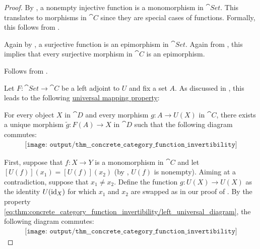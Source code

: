 \begin{proof}
   By , a nonempty injective function is a monomorphism in \( \cat{Set} \). This translates to morphisms in \( \cat{C} \) since they are special cases of functions. Formally, this follows from .

   Again by , a surjective function is an epimorphism in \( \cat{Set} \). Again from , this implies that every surjective morphism in \( \cat{C} \) is an epimorphism.

   Follows from .

   Let \( F: \cat{Set} \to \cat{C} \) be a left adjoint to \( U \) and fix a set \( A \). As discussed in , this leads to the following \hyperref[rem:universal_mapping_property]{universal mapping property}:
  \begin{displayquote}
    For every object \( X \) in \( \cat{D} \) and every morphism \( g: A \to U(X) \) in \( \cat{C} \), there exists a unique morphism \( \widetilde{g}: F(A) \to X \) in \( \cat{D} \) such that the following diagram commutes:
    \begin{equation}\label{eq:thm:concrete_category_function_invertibility/left_universal_diagram}
      \begin{aligned}
        \texttt{[image: output/thm\_\_concrete\_category\_function\_invertibility]}
      \end{aligned}
    \end{equation}
  \end{displayquote}

  First, suppose that \( f: X \to Y \) is a monomorphism in \( \cat{C} \) and let \( [U(f)](x_1) = [U(f)](x_2) \) (by , \( U(f) \) is nonempty). Aiming at a contradiction, suppose that \( x_1 \neq x_2 \). Define the function \( g: U(X) \to U(X) \) as the identity \( U(\operatorname{id}_X) \) for which \( x_1 \) and \( x_2 \) are swapped as in our proof of . By the property \eqref{eq:thm:concrete_category_function_invertibility/left_universal_diagram}, the following diagram commutes:
  \begin{equation}\label{eq:thm:concrete_category_function_invertibility/left_diagram}
    \begin{aligned}
      \texttt{[image: output/thm\_\_concrete\_category\_function\_invertibility]}
    \end{aligned}
  \end{equation}


\end{proof}
